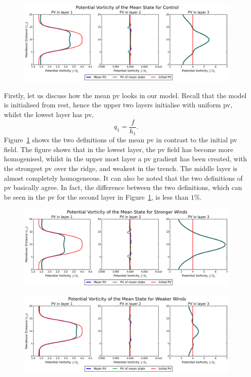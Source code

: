 \documentclass[12pt,a4paper]{report}
\newcommand*\figref[1]{Figure~\ref{#1}}
\begin{document}
 \begin{figure}
 	\centering
 	\includegraphics[width=\linewidth]{meanpv_0}
 	\caption{ }
 	\label{meanpv0}
 \end{figure}
 
 Firstly, let us discuss how the mean \gls{pv} looks in our model. Recall that the model
 is initialised from rest, hence the upper two layers initialise with uniform \gls{pv},
 whilst the lowest layer has \gls{pv},
 \begin{equation*}
 q_{1}=\frac{f}{h_{1}}.
 \end{equation*}
 \figref{meanpv0} shows the two definitions of the mean \gls{pv} in contrast to the initial
 \gls{pv} field. The figure shows that in the lowest layer, the \gls{pv} field has 
 become more homogenised, whilst in the upper most layer a \gls{pv} gradient has been 
 created, with the strongest \gls{pv} over the ridge, and weakest in the trench. The 
 middle layer is almost completely homogeneous. It can also be noted that the two 
 definitions of \gls{pv} basically agree. In fact, the difference between the two
 definitions, which can be seen in the \gls{pv} for the second layer in \figref{meanpv0},
 is less than $1\%$. 
 
 \begin{figure}
 	\centering
 	\includegraphics[width=\linewidth]{meanpv_1}
 	\caption{ }
 	\label{meanpv1}
 \end{figure}
 
 \begin{figure}
 	\centering
 	\includegraphics[width=\linewidth]{meanpv_2}
 	\caption{ }
 	\label{meanpv2}
 \end{figure}
 
\end{document}
